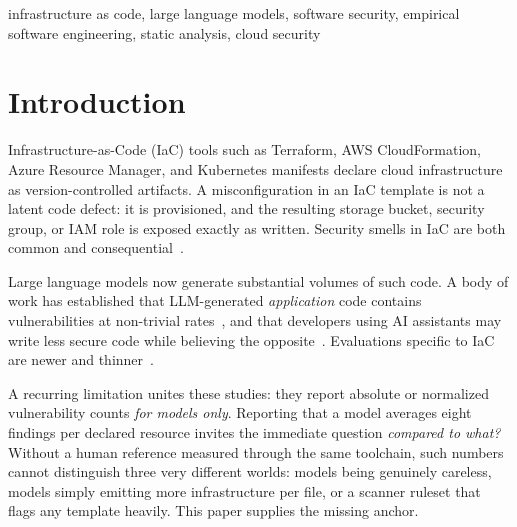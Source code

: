 \documentclass[conference]{IEEEtran}
\begin{document}
\begin{IEEEkeywords}
infrastructure as code, large language models, software security, empirical
software engineering, static analysis, cloud security
\end{IEEEkeywords}

\section{Introduction}

Infrastructure-as-Code (IaC) tools such as Terraform, AWS CloudFormation, Azure
Resource Manager, and Kubernetes manifests declare cloud infrastructure as
version-controlled artifacts. A misconfiguration in an IaC template is not a
latent code defect: it is provisioned, and the resulting storage bucket,
security group, or IAM role is exposed exactly as written. Security smells in
IaC are both common and consequential~\cite{rahman2019seven,verdet2023exploring}.

Large language models now generate substantial volumes of such code. A body of
work has established that LLM-generated \emph{application} code contains
vulnerabilities at non-trivial rates~\cite{pearce2022asleep,sandoval2023lost,tihanyi2025secure},
and that developers using AI assistants may write less secure code while
believing the opposite~\cite{perry2023users}. Evaluations specific to IaC are
newer and thinner~\cite{vargas2026securityfirst}.

A recurring limitation unites these studies: they report absolute or normalized
vulnerability counts \emph{for models only}. Reporting that a model averages
eight findings per declared resource invites the immediate question
\emph{compared to what?} Without a human reference measured through the same
toolchain, such numbers cannot distinguish three very different worlds: models
being genuinely careless, models simply emitting more infrastructure per file,
or a scanner ruleset that flags any template heavily. This paper supplies the
missing anchor.
\end{document}
